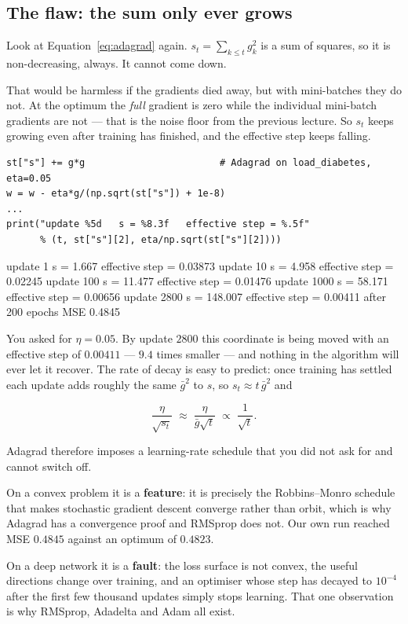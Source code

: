 \documentclass[11pt]{article}
\begin{document}
\subsection{The flaw: the sum only ever grows}
\label{sec:adagradflaw}

Look at Equation~\eqref{eq:adagrad} again. $s_t = \sum_{k \le t} g_k^2$ is a sum
of squares, so it is non-decreasing, always. It cannot come down.

That would be harmless if the gradients died away, but with mini-batches they
do not. At the optimum the \emph{full} gradient is zero while the individual
mini-batch gradients are not --- that is the noise floor from the previous
lecture. So $s_t$ keeps growing even after training has finished, and the
effective step keeps falling.

\begin{lstlisting}
st["s"] += g*g                        # Adagrad on load_diabetes, eta=0.05
w = w - eta*g/(np.sqrt(st["s"]) + 1e-8)
...
print("update %5d   s = %8.3f   effective step = %.5f"
      % (t, st["s"][2], eta/np.sqrt(st["s"][2])))
\end{lstlisting}
\begin{codeout}
update     1   s =    1.667   effective step = 0.03873
update    10   s =    4.958   effective step = 0.02245
update   100   s =   11.477   effective step = 0.01476
update  1000   s =   58.171   effective step = 0.00656
update  2800   s =  148.007   effective step = 0.00411
after 200 epochs                   MSE 0.4845
\end{codeout}

You asked for $\eta = 0.05$. By update $2800$ this coordinate is being moved
with an effective step of $0.00411$ --- $9.4$ times smaller --- and nothing in
the algorithm will ever let it recover. The rate of decay is easy to predict:
once training has settled each update adds roughly the same $\bar g^2$ to $s$,
so $s_t \approx t\,\bar g^2$ and

\begin{equation}
  \label{eq:adagraddecay}
  \frac{\eta}{\sqrt{s_t}} \;\approx\; \frac{\eta}{\bar g \sqrt{t}}
  \;\propto\; \frac{1}{\sqrt{t}} .
\end{equation}

Adagrad therefore imposes a learning-rate schedule that you did not ask for and
cannot switch off.

\begin{caution}
On a convex problem it is a \textbf{feature}: it is precisely the
Robbins--Monro schedule that makes stochastic gradient descent converge rather
than orbit, which is why Adagrad has a convergence proof and RMSprop does not.
Our own run reached MSE $0.4845$ against an optimum of $0.4823$.

On a deep network it is a \textbf{fault}: the loss surface is not convex, the
useful directions change over training, and an optimiser whose step has decayed
to $10^{-4}$ after the first few thousand updates simply stops learning. That
one observation is why RMSprop, Adadelta and Adam all exist.
\end{caution}
\end{document}
